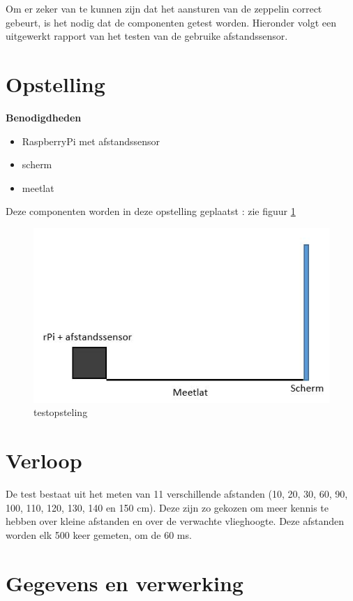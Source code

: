 \documentclass{peno-opdracht3}
\begin{document}
\maketitle
Om er zeker van te kunnen zijn dat het aansturen van de zeppelin correct gebeurt, is het nodig dat de componenten getest worden. Hieronder volgt een uitgewerkt rapport van het testen van de gebruike afstandssensor.\\
\section{Opstelling}
\textbf{Benodigdheden}
\begin{itemize}
	\item RaspberryPi met afstandssensor
	\item scherm
	\item meetlat
\end{itemize}
Deze componenten worden in deze opstelling geplaatst : zie figuur \ref{opstelling}
\begin{figure}[ht!]%
\centering
\includegraphics[scale=0.6]{opstelling.jpg}%
\caption{testopsteling}%
\label{opstelling}%
\end{figure}
\section{Verloop}
De test bestaat uit het meten van 11 verschillende afstanden (10, 20, 30, 60, 90, 100, 110, 120, 130, 140 en 150 cm). Deze zijn zo gekozen om meer kennis te hebben over kleine afstanden en over de verwachte vlieghoogte. Deze afstanden worden elk 500 keer gemeten, om de 60 ms. 

\section{Gegevens en verwerking}
\end{document}
